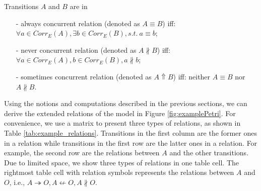 \documentclass{llncs}
\begin{document}
\begin{definition}\label{def:concurrentRelations}
Transitions $A$ and $B$ are in
	\begin{itemize}
		\item[-] always concurrent relation (denoted as $A\equiv B$) iff: $\forall a\in Corr_{E}(A),\exists b\in Corr_{E}(B),s.t.~a\equiv b$;
		\item[-] never concurrent relation (denoted as $A\nparallel B$) iff: $\forall a\in Corr_{E}(A),b\in Corr_{E}(B),a\nparallel b$;
		\item[-] sometimes concurrent relation (denoted as $A\Uparrow B$) iff: neither $A\equiv B$ nor $A\nparallel B$.
	\end{itemize}
\end{definition}

\begin{example}\label{ex:examplePetriRelations}
Using the notions and computations described in the previous sections, we can derive the extended relations of the model in Figure \ref{fig:examplePetri}. For convenience, we use a matrix to present three types of relations, as shown in Table \ref{tab:example_relations}. Transitions in the first column are the former ones in a relation while transitions in the first row are the latter ones in a relation. For example, the second row are the relations between $A$ and the other transitions. Due to limited space, we show three types of relations in one table cell. The rightmost table cell with relation symbols represents the relations between $A$ and $O$, i.e., $A\twoheadrightarrow O,A\nleftarrow O,A\nparallel O$.
\end{example}
\end{document}
